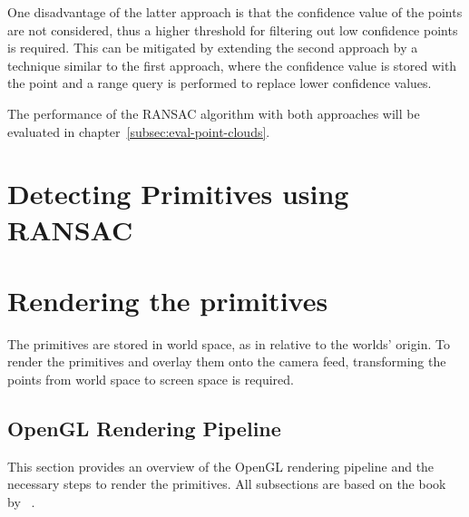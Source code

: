 One disadvantage of the latter approach is that the confidence value of the points are not considered,
thus a higher threshold for filtering out low confidence points is required.
This can be mitigated by extending the second approach by a technique similar to the first approach,
where the confidence value is stored with the point and a range query is performed to replace lower confidence values.

The performance of the RANSAC algorithm with both approaches will be evaluated in chapter~\ref{subsec:eval-point-clouds}.


\section{Detecting Primitives using RANSAC}

\parencite{schnabel_efficient_2007}


\section{Rendering the primitives}\label{sec:rendering-the-primitives}
The primitives are stored in world space, as in relative to the worlds' origin.
To render the primitives and overlay them onto the camera feed,
transforming the points from world space to screen space is required.

\subsection{OpenGL Rendering Pipeline}
This section provides an overview of the OpenGL rendering pipeline and the necessary steps to render the primitives.
All subsections are based on the book~ by \citeauthor{de_vries_learn_2020}~\parencite{de_vries_learn_2020}.

